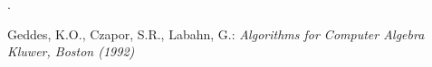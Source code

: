 \documentclass [12pt]{article}
\numberwithin{equation}{section}
\begin{document}
 .
%
%
%
%
%

\begin{thebibliography}{99}

Geddes, K.O., Czapor, S.R., Labahn, G.: \textit{Algorithms for Computer Algebra Kluwer, Boston (1992)}
\end{thebibliography}
\end{document}
